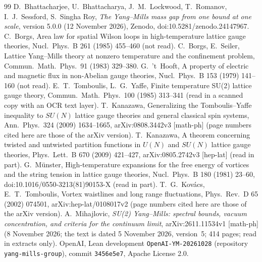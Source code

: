 \documentclass[11pt,a4paper]{article}
\theoremstyle{plain}
\theoremstyle{definition}
\theoremstyle{remark}
\numberwithin{equation}{section}
\begin{document}
{\small
\begin{thebibliography}{99}\setlength{\itemsep}{1pt}
 D.~Bhattacharjee, U.~Bhattacharya, J.~M.~Lockwood, T.~Romanov, I.~J.~Sessford, S.~Singha Roy, \emph{The Yang--Mills mass gap from one bound at one scale}, version 5.0.0 (12 November 2026), Zenodo, doi:10.5281/zenodo.24147967.
 C.~Borgs, Area law for spatial Wilson loops in high-temperature lattice gauge theories, Nucl.\ Phys.\ B 261 (1985) 455--460 (not read).
 C.~Borgs, E.~Seiler, Lattice Yang--Mills theory at nonzero temperature and the confinement problem, Commun.\ Math.\ Phys.\ 91 (1983) 329--380.
 G.~'t~Hooft, A property of electric and magnetic flux in non-Abelian gauge theories, Nucl.\ Phys.\ B 153 (1979) 141--160 (not read).
 E.~T.~Tomboulis, L.~G.~Yaffe, Finite temperature SU(2) lattice gauge theory, Commun.\ Math.\ Phys.\ 100 (1985) 313--341 (read in a scanned copy with an OCR text layer).
 T.~Kanazawa, Generalizing the Tomboulis--Yaffe inequality to $SU(N)$ lattice gauge theories and general classical spin systems, Ann.\ Phys.\ 324 (2009) 1634--1665, arXiv:0808.3442v3 [math-ph] (page numbers cited here are those of the arXiv version).
 T.~Kanazawa, A theorem concerning twisted and untwisted partition functions in $U(N)$ and $SU(N)$ lattice gauge theories, Phys.\ Lett.\ B 670 (2009) 421--427, arXiv:0805.2742v3 [hep-lat] (read in part). G.~M\"unster, High-temperature expansions for the free energy of vortices and the string tension in lattice gauge theories, Nucl.\ Phys.\ B 180 (1981) 23--60, doi:10.1016/0550-3213(81)90153-X (read in part). T.~G.~Kov\'acs, E.~T.~Tomboulis, Vortex waistlines and long range fluctuations, Phys.\ Rev.\ D 65 (2002) 074501, arXiv:hep-lat/0108017v2 (page numbers cited here are those of the arXiv version). A.~Mihajlovic, \emph{SU(2) Yang--Mills: spectral bounds, vacuum concentration, and criteria for the continuum limit}, arXiv:2611.11534v1 [math-ph] (8 November 2026; the text is dated 5 November 2026, version~5; 414 pages; read in extracts only).
 OpenAI, Lean development \texttt{OpenAI-YM-20261028} (repository \texttt{yang-mills-group}), commit \texttt{3456e5e7}, Apache License 2.0.
\end{thebibliography}}
\end{document}
